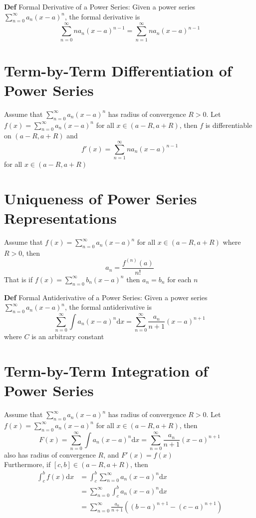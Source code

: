 \documentclass[11pt,notitlepage]{report}
\begin{document}
\newpage

\textbf{Def} Formal Derivative of a Power Series: Given a power series $\sum_{n=0}^\infty a_n(x-a)^n$, the formal derivative is
$$\sum_{n=0}^\infty na_n(x-a)^{n-1} = \sum_{n=1}^\infty na_n(x-a)^{n-1}$$

\section{Term-by-Term Differentiation of Power Series}Assume that $\sum_{n=0}^\infty a_n(x-a)^n$
has radius of convergence $R > 0$. Let $f(x) = \sum_{n=0}^\infty a_n(x-a)^n$ for all $x \in (a-R, a+R)$, then $f$ is differentiable on $(a-R, a+R)$ and
$$f'(x) = \sum_{n=1}^\infty na_n(x-a)^{n-1}$$ for all $x \in (a-R, a+R)$

\section{Uniqueness of Power Series Representations}Assume that $f(x) = \sum_{n=0}^\infty a_n(x-a)^n$
for all $x \in (a-R, a+R)$ where $R > 0$, then 
$$a_n = \frac{f^{(n)}(a)}{n!}$$
That is if $f(x) = \sum_{n=0}^\infty b_n(x-a)^n$ then $a_n = b_n$ for each $n$

\textbf{Def} Formal Antiderivative of a Power Series: Given a power series $\sum_{n=0}^\infty a_n(x-a)^n$, the formal antiderivative is
$$\sum_{n=0}^\infty \int a_n(x-a)^{n}\mathrm{d}x = \sum_{n=0}^\infty \frac{a_n}{n+1}(x-a)^{n+1}$$
where $C$ is an arbitrary constant

\section{Term-by-Term Integration of Power Series}Assume that $\sum_{n=0}^\infty a_n(x-a)^n$
has radius of convergence $R > 0$. Let $f(x) = \sum_{n=0}^\infty a_n(x-a)^n$ for all $x \in (a-R, a+R)$, then
$$F(x) = \sum_{n=0}^\infty \int a_n(x-a)^{n}\mathrm{d}x = \sum_{n=0}^\infty \frac{a_n}{n+1}(x-a)^{n+1}$$
also has radius of convergence $R$, and $F'(x) = f(x)$\\
\newpage
Furthermore, if $[c, b] \in (a-R, a+R)$, then
\begin{align*}
    \int_c^b f(x) \mathrm{d}x &= \int_c^b \sum_{n=0}^\infty a_n(x-a)^{n} \mathrm{d}x\\
    &= \sum_{n=0}^\infty \int_c^b a_n(x-a)^{n}\mathrm{d}x\\
    &= \sum_{n=0}^\infty \frac{a_n}{n+1}((b-a)^{n+1}-(c-a)^{n+1})\\
\end{align*}
\end{document}
